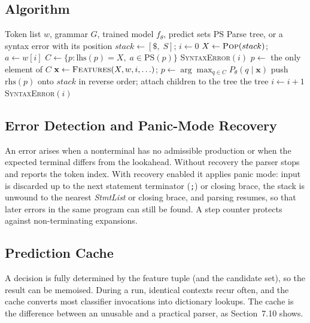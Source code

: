 \documentclass[12pt,a4paper]{article}
\newcommand{\ntm}[1]{\textit{#1}}
\newcommand{\tok}[1]{\texttt{#1}}
\begin{document}
\subsection{Algorithm}

\begin{algorithm}[H]
\caption{ML-assisted predictive parsing (guarded mode)}
\label{alg:mlparse}
\begin{algorithmic}[1]
\Require Token list $w$, grammar $G$, trained model $f_\theta$, predict sets $\mathrm{PS}$
\Ensure Parse tree, or a syntax error with its position
\State $stack \gets [\$,\;S]$; \quad $i \gets 0$
  \State $X \gets \textsc{Pop}(stack)$; \quad $a \gets w[i]$
     \State $C \gets \{p : \mathrm{lhs}(p)=X,\; a\in\mathrm{PS}(p)\}$
      \State \Return \textsc{SyntaxError}$(i)$ \EndIf
      \State $p \gets$ the only element of $C$
     \Else \State $\mathbf{x} \gets \textsc{Features}(X,w,i,\ldots)$; \quad $p \gets \arg\max_{q\in C} P_\theta(q\mid\mathbf{x})$ \EndIf
     \State push $\mathrm{rhs}(p)$ onto $stack$ in reverse order; attach children to the tree
      \State \Return the tree \EndIf
     \State $i \gets i+1$
  \Else
     \State \Return \textsc{SyntaxError}$(i)$
  \EndIf
\EndWhile
\end{algorithmic}
\end{algorithm}

\subsection{Error Detection and Panic-Mode Recovery}

An error arises when a nonterminal has no admissible production or when the
expected terminal differs from the lookahead. Without recovery the parser stops
and reports the token index. With recovery enabled it applies panic mode:
input is discarded up to the next statement terminator (\tok{;}) or closing
brace, the stack is unwound to the nearest \ntm{StmtList} or closing brace, and
parsing resumes, so that later errors in the same program can still be found.
A step counter protects against non-terminating expansions.

\subsection{Prediction Cache}

A decision is fully determined by the feature tuple (and the candidate set), so
the result can be memoised. During a run, identical contexts recur often, and
the cache converts most classifier invocations into dictionary lookups. The
cache is the difference between an unusable and a practical parser, as
Section~7.10 shows.
\end{document}
